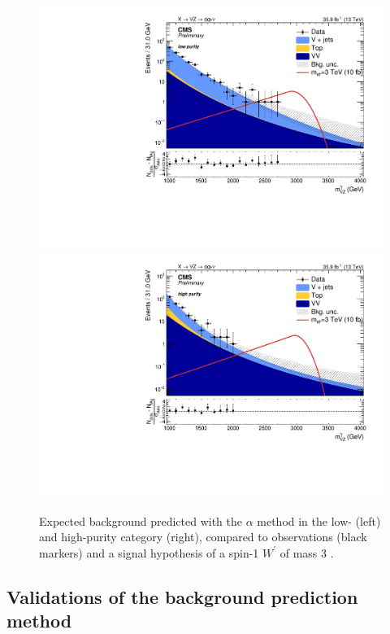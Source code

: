 \begin{figure}[!htb]
  \centering
    \includegraphics[width=.495\textwidth]{figures/XVZnnlp_XWZInv_BkgSR.pdf}
    \includegraphics[width=.495\textwidth]{figures/XVZnnhp_XWZInv_BkgSR.pdf}
  \caption{Expected background predicted with the $\alpha$ method in the low- (left) and high-purity category (right), compared to observations (black markers) and a signal hypothesis of a spin-1 $W^{'}$ of mass 3 \TeV.}
  \label{fig:XVZnn_Exp}
\end{figure}


\subsection{Validations of the background prediction method}
\label{ssec:alpha_validation}


